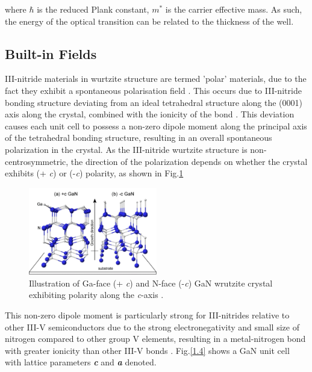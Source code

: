where $\hbar$ is the reduced Plank constant, $m^{*}$ is the carrier effective mass. As such, the energy of the optical transition can be related to the thickness of the well.





\subsection{Built-in Fields} 
\label{section1.1.3}
III-nitride materials in wurtzite structure are termed 'polar' materials, due to the fact they exhibit a spontaneous polarisation field \cite{Ambacher2002}. This occurs due to III-nitride bonding structure deviating from an ideal tetrahedral structure along the (0001) axis along the crystal, combined with the ionicity of the bond \cite{Ren2015}. This deviation causes each unit cell to possess a non-zero dipole moment along the principal axis of the tetrahedral bonding structure, resulting in an overall spontaneous polarization in the crystal. As the III-nitride wurtzite structure is non-centrosymmetric, the direction of the polarization depends on whether the crystal exhibits (+ {\it c}) or (-{\it c}) polarity, as shown in Fig.\ref{1.3}

\begin{figure}[h]
	\centering
	\includegraphics[width=0.5\textwidth]{Figs/Ch1/p2.png}
	\caption {Illustration of Ga-face (+ {\it c}) and N-face (-{\it c}) GaN wrutzite crystal exhibiting polarity along the {\it c}-axis \cite{Sumiya2004}.}
	\label{1.3}
\end{figure}
\FloatBarrier

This non-zero dipole moment is particularly strong for III-nitrides relative to other III-V semiconductors due to the strong electronegativity and small size of nitrogen compared to other group V elements, resulting in a metal-nitrogen bond with greater ionicity than other III-V bonds \cite{wood2007polarization}. Fig.\ref{1.4} shows a GaN unit cell with lattice parameters {\textbf {\it c}} and \textbf{\it a} denoted.

